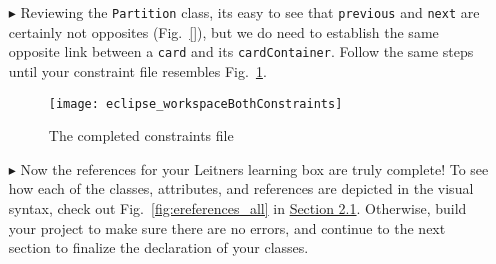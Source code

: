 \begin{itemize}
\item[$\blacktriangleright$] Reviewing the \texttt{Partition} class, its easy to see that \texttt{previous} and \texttt{next} are certainly not opposites
(Fig.~\ref{}), but we do need to establish the same opposite link between a \texttt{card} and its \texttt{cardContainer}. Follow the same steps until your
constraint file resembles Fig.~\ref{fig:bothConstraints}.

\begin{figure}[htbp]
	\centering
  \texttt{[image: eclipse\_workspaceBothConstraints]}
	\caption{The completed constraints file}
	\label{fig:bothConstraints}
\end{figure} 

\item[$\blacktriangleright$] Now the references for your Leitners learning box are truly complete! To see how each of the classes, attributes, and references
are depicted in the visual syntax, check out Fig.~\ref{fig:ereferences_all} in \hyperlink{sec:static vis}{Section 2.1}. Otherwise, build your project to
make sure there are no errors, and continue to the next section to finalize the declaration of your classes.


\end{itemize}
